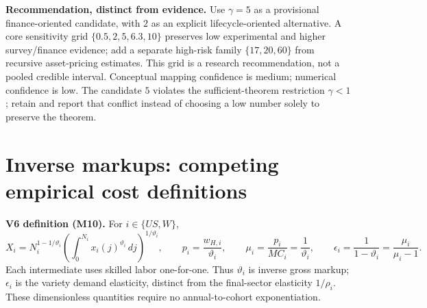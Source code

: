 \documentclass[10pt,a4paper,landscape]{article}
\newcommand{\src}[1]{\hyperlink{ref:#1}{\textsf{[#1]}}}
\begin{document}
\noindent\textbf{Recommendation, distinct from evidence.}
Use $\gamma=5$ as a provisional finance-oriented candidate, with $2$ as an
explicit lifecycle-oriented alternative. A core sensitivity grid
$\{0.5,2,5,6.3,10\}$ preserves low experimental and higher survey/finance
evidence; add a separate high-risk family $\{17,20,60\}$ from recursive
asset-pricing estimates. This grid is a research recommendation, not a pooled
credible interval. Conceptual mapping confidence is medium; numerical
confidence is low. The candidate $5$ violates the sufficient-theorem
restriction $\gamma<1$; retain and report that conflict instead of choosing
a low number solely to preserve the theorem.


\clearpage
\section[Inverse markups: competing empirical cost definitions]{Inverse markups: competing empirical cost definitions}
\textbf{V6 definition (M10).} For $i\in\{US,W\}$,
\[
X_i=N_i^{1-1/\vartheta_i}\left(\int_0^{N_i}x_i(j)^{\vartheta_i}\,dj\right)^{1/\vartheta_i},
\qquad p_i=\frac{w_{H,i}}{\vartheta_i},\qquad
\mu_i=\frac{p_i}{MC_i}=\frac1{\vartheta_i},\qquad
\epsilon_i=\frac1{1-\vartheta_i}=\frac{\mu_i}{\mu_i-1}.
\]
Each intermediate uses skilled labor one-for-one. Thus $\vartheta_i$ is inverse gross markup; $\epsilon_i$ is the variety demand elasticity, distinct from the final-sector elasticity $1/\rho_i$. These dimensionless quantities require no annual-to-cohort exponentiation.
\end{document}
